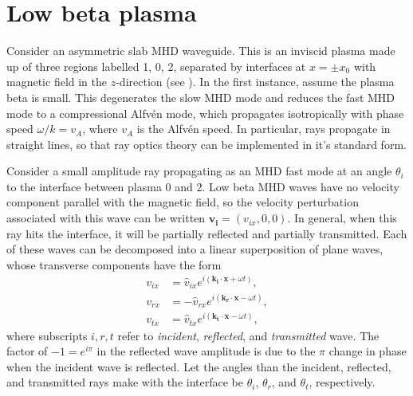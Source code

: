 \documentclass[12pt]{article}
\begin{document}
	\section{Low beta plasma}
	
	Consider an asymmetric slab MHD waveguide. This is an inviscid plasma made up of three regions labelled 1, 0, 2, separated by interfaces at $x = \pm x_0$ with magnetic field in the $z$-direction (see \citep{all_etal17}). In the first instance, assume the plasma beta is small. This degenerates the slow MHD mode and reduces the fast MHD mode to a compressional Alfv\'{e}n mode, which propagates isotropically with phase speed $\omega / k = v_A$, where $v_A$ is the Alfv\'{e}n speed. In particular, rays propagate in straight lines, so that ray optics theory can be implemented in it's standard form. 
	
	Consider a small amplitude ray propagating as an MHD fast mode at an angle $\theta_i$ to the interface between plasma 0 and 2. Low beta MHD waves have no velocity component parallel with the magnetic field, so the velocity perturbation associated with this wave can be written $\mathbf{v_i} = (v_{ix}, 0, 0)$. In general, when this ray hits the interface, it will be partially reflected and partially transmitted. Each of these waves can be decomposed into a linear superposition of plane waves, whose transverse components have the form
	\begin{align}
	v_{ix} &= \hat{v}_{ix} e^{i(\mathbf{k_i}\cdot \mathbf{x} + \omega t)}, \\
	v_{rx} &= -\hat{v}_{rx} e^{i(\mathbf{k_r}\cdot \mathbf{x} - \omega t)}, \\
	v_{tx} &= \hat{v}_{tx} e^{i(\mathbf{k_t}\cdot \mathbf{x} - \omega t)},
	\end{align}
	where subscripts $i, r, t$ refer to \textit{incident}, \textit{reflected}, and \textit{transmitted} wave. The factor of $-1 = e^{i\pi}$ in the reflected wave amplitude is due to the $\pi$ change in phase when the incident wave is reflected. Let the angles than the incident, reflected, and transmitted rays make with the interface be $\theta_i$, $\theta_r$, and $\theta_t$, respectively.
	
\end{document}
